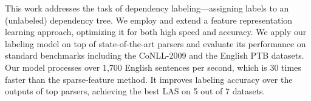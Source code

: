 This work addresses the task of dependency labeling—assigning labels to an (unlabeled) dependency tree. We employ and extend a feature representation learning approach, optimizing it for both high speed and accuracy. We apply our labeling model on top of state-of-the-art parsers and evaluate its performance on standard benchmarks including the CoNLL-2009 and the English PTB datasets. Our model processes over 1,700 English sentences per second, which is 30 times faster than the sparse-feature method. It improves labeling accuracy over the outputs of top parsers, achieving the best LAS on 5 out of 7 datasets.

